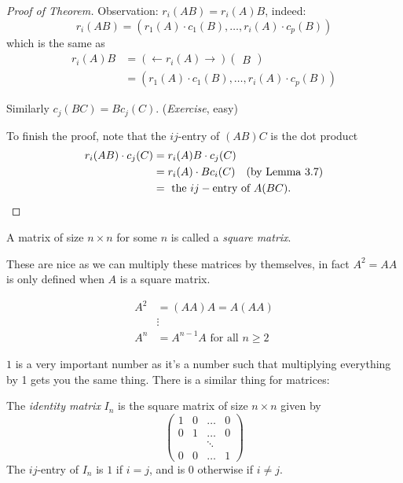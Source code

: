 \documentclass[10pt]{scrartcl}
\begin{document}
\begin{proof}[Proof of Theorem]
	Observation: $r_i(AB) = r_i(A)B$, indeed: 
	\[
  r_i(AB) = (r_1(A)\cdot c_1(B),\dots,r_i(A)\cdot c_p(B)) 
\]
which is the same as 
\begin{align*}
  r_i(A)B &= (\leftarrow r_i(A) \rightarrow) \begin{pmatrix}
 B	
 \end{pmatrix}\\
 &= (r_1(A)\cdot c_1(B),\dots,r_i(A)\cdot c_p(B))
\end{align*}

Similarly $c_j(BC) = Bc_j(C)$. (\emph{Exercise}, easy)

To finish the proof, note that the $ij$-entry of $(AB)C$ is the dot product 
\begin{align*}
  r_i(AB)\cdot c_j(C) &= r_i(A)B \cdot c_j(C)\\
  &= r_i(A)\cdot Bc_i(C) \quad \text{(by Lemma 3.7)}\\
  &= \text{ the } ij-\text{entry of } A(BC).\qedhere
\end{align*}
\end{proof}


\vsp
\begin{definition}
A matrix of size $n \times n$ for some $n$ is called a \emph{square matrix}.	
\end{definition}

These are nice as we can multiply these matrices by themselves, in fact $A^2 = AA$ is only defined when $A$ is a square matrix. 

\begin{align*}
  A^2 &= (AA)A = A(AA)\\
  &\vdots\\
  A^n &= A^{n-1}A \text{ for all } n \geq 2
\end{align*}

$1$ is a very important number as it's a number such that multiplying everything by 1 gets you the same thing. There is a similar thing for matrices:\\

\begin{definition}
The \emph{identity matrix} $I_n$ is the square matrix of size $n \times n$ given by 
\[
  \begin{pmatrix}
  1 & 0 & \dots & 0\\
  0 & 1 & \dots & 0\\
   & & \ddots & \\
  0 & 0 & \dots & 1	
  \end{pmatrix}
\]
The $ij$-entry of $I_n$ is $1$ if $i=j$, and is $0$ otherwise if $i \neq j$. 
\end{definition}\vsp
\end{document}
